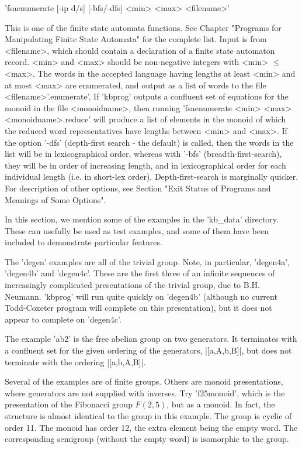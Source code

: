 
'fsaenumerate  [-ip d/s] [-bfs/-dfs] <min> <max> <filename>' 

This is one of the finite state automata functions. See Chapter 
"Programs for Manipulating Finite State Automata" for the complete list.
Input is from <filename>, which should contain a declaration of a finite
state automaton record.
<min> and <max> should be non-negative integers with <min> $\le$ <max>.
The words in the accepted language having lengths at least <min> and at
most <max> are enumerated, and output as a list of words to the file
<filename>'.enumerate'.
If 'kbprog' outputs a confluent set of equations for the monoid in the file
<monoidname>, then running 'fsaenumerate <min> <max> <monoidname>.reduce'
will produce a list of elements in the monoid of which the reduced 
word representatives have lengths between <min> and <max>.
If the option '-dfs' (depth-first search - the default) is called,
then the words
in the list will be in lexicographical order, whereas with '-bfs'
(breadth-first-search), they will be in order of increasing length, and in
lexicographical order for each individual length (i.e. in short-lex order).
Depth-first-search is marginally quicker.
For description of other options, see Section
"Exit Status of Programs and Meanings of Some Options".

In this section, we mention some of the examples in the 'kb\_data' directory.
These can usefully be used as test examples, and some of them have been
included to demonstrate particular features.

The 'degen' examples  are all of the trivial group. Note, in particular,
'degen4a', 'degen4b' and 'degen4c'. These are the first three of an
infinite sequences of increasingly complicated presentations of the
trivial group, due to B.H. Neumann. 'kbprog' will run quite quickly on
'degen4b' (although no current Todd-Coxeter program will complete on this
presentation), but it does not appear to complete on 'degen4c'.

The example 'ab2' is the free abelian group on two generators.
It terminates with a confluent set for the given ordering of the
generators, |[a,A,b,B]|, but does not terminate with the ordering |[a,b,A,B]|.

Several of the examples are of finite groups. 
Others are monoid presentations, where generators are not supplied with
inverses. Try 'f25monoid', which is the presentation of the Fibonacci group
$F(2,5)$, but as a monoid. In fact, the structure is almost identical to
the group in this example. The group is cyclic of order 11.
The monoid has order 12, the extra element being the empty word.
The corresponding semigroup (without the empty word) is isomorphic to the
group.


